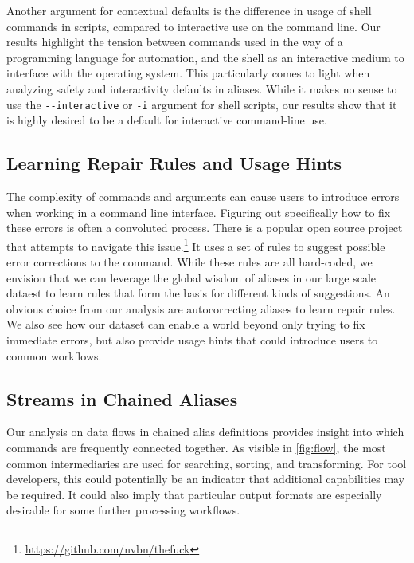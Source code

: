 Another argument for contextual defaults is the difference in usage of shell commands in scripts, compared to interactive use on the command line.
Our results highlight the tension between commands used in the way of a programming language for automation, and the shell as an interactive medium to interface with the operating system.
This particularly comes to light when analyzing safety and interactivity defaults in aliases.
While it makes no sense to use the \verb|--interactive| or \verb|-i| argument for shell scripts, our results show that it is highly desired to be a default for interactive command-line use.

\subsection{Learning Repair Rules and Usage Hints}

The complexity of commands and arguments can cause users to introduce errors when working in a command line interface.
Figuring out specifically how to fix these errors is often a convoluted process.
There is a popular open source project that attempts to navigate this issue.\footnote{\url{https://github.com/nvbn/thefuck}}
It uses a set of rules to suggest possible error corrections to the command.
While these rules are all hard-coded, we envision that we can leverage the global wisdom of aliases in our large scale dataest to learn rules that form the basis for different kinds of suggestions.
An obvious choice from our analysis are autocorrecting aliases to learn repair rules.
We also see how our dataset can enable a world beyond only trying to fix immediate errors, but also provide usage hints that could introduce users to common workflows.

\subsection{Streams in Chained Aliases}

Our analysis on data flows in chained alias definitions provides insight into which commands are frequently connected together.
As visible in \cref{fig:flow}, the most common intermediaries are used for searching, sorting, and transforming.
For tool developers, this could potentially be an indicator that additional capabilities may be required.
It could also imply that particular output formats are especially desirable for some further processing workflows.



